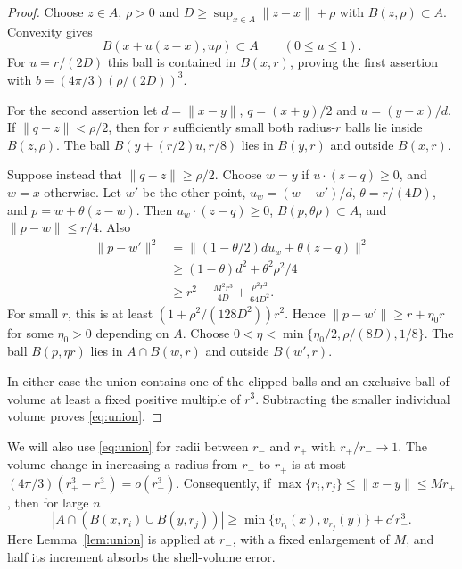 \documentclass[11pt]{article}
\newcommand{\norm}[1]{\lVert #1\rVert}
\begin{document}
\begin{proof}
Choose $z\in A$, $\rho>0$ and $D\geq\sup_{x\in A}\norm{z-x}+\rho$ with
$B(z,\rho)\subset A$. Convexity gives
\begin{equation}\label{eq:inball}
 B(x+u(z-x),u\rho)\subset A\qquad(0\leq u\leq1).
\end{equation}
For $u=r/(2D)$ this ball is contained in $B(x,r)$, proving the first
assertion with $b=(4\pi/3)(\rho/(2D))^3$.

For the second assertion let $d=\norm{x-y}$, $q=(x+y)/2$ and
$u=(y-x)/d$. If $\norm{q-z}<\rho/2$, then for $r$ sufficiently small
both radius-$r$ balls lie inside $B(z,\rho)$. The ball
$B(y+(r/2)u,r/8)$ lies in $B(y,r)$ and outside $B(x,r)$.

Suppose instead that $\norm{q-z}\geq\rho/2$. Choose $w=y$ if
$u\cdot(z-q)\geq0$, and $w=x$ otherwise. Let $w'$ be the other point,
$u_w=(w-w')/d$, $\theta=r/(4D)$, and $p=w+\theta(z-w)$. Then
$u_w\cdot(z-q)\geq0$, $B(p,\theta\rho)\subset A$, and $\norm{p-w}\leq r/4$.
Also
\begin{align*}
 \norm{p-w'}^2
 &=\norm{(1-\theta/2)d u_w+\theta(z-q)}^2\\
 &\geq(1-\theta)d^2+\theta^2\rho^2/4\\
 &\geq r^2-\frac{M^2r^3}{4D}+\frac{\rho^2r^2}{64D^2}.
\end{align*}
For small $r$, this is at least $(1+\rho^2/(128D^2))r^2$.
Hence $\norm{p-w'}\geq r+\eta_0r$ for some $\eta_0>0$ depending on $A$.
Choose
$0<\eta<\min\{\eta_0/2,\rho/(8D),1/8\}$.
The ball $B(p,\eta r)$ lies in $A\cap B(w,r)$ and outside $B(w',r)$.

In either case the union contains one of the clipped balls and an
exclusive ball of volume at least a fixed positive multiple of $r^3$.
Subtracting the smaller individual volume proves \eqref{eq:union}.
\end{proof}

We will also use \eqref{eq:union} for radii between $r_-$ and $r_+$ with
$r_+/r_-\to1$. The volume change in increasing a radius from $r_-$ to
$r_+$ is at most $(4\pi/3)(r_+^3-r_-^3)=o(r_-^3)$. Consequently, if
$\max\{r_i,r_j\}\leq\norm{x-y}\leq Mr_+$, then for large $n$
\begin{equation}\label{eq:mixed-union}
 |A\cap(B(x,r_i)\cup B(y,r_j))|
 \geq\min\{v_{r_i}(x),v_{r_j}(y)\}+c'r_-^3.
\end{equation}
Here Lemma~\ref{lem:union} is applied at $r_-$, with a fixed enlargement
of $M$, and half its increment absorbs the shell-volume error.
\end{document}
